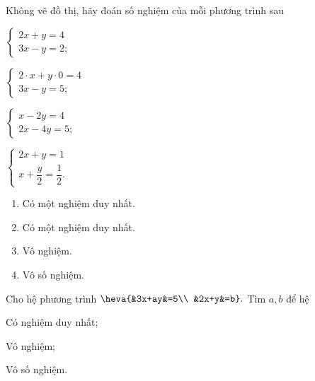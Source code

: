 \begin{bt}%
	Không vẽ đồ thị, hãy đoán số nghiệm của mỗi phương trình sau
	\begin{enumEX}{4}
	\item $\begin{cases}
	{2x + y = 4}\\
	{3x - y = 2;}
	\end{cases}$
	\item $\begin{cases}
	{2\cdot x + y\cdot 0 = 4}\\
	{3x - y = 5;}
	\end{cases}$
	\item $\begin{cases}
	{x - 2y = 4}\\
	{2x - 4y = 5;}
	\end{cases}$
	\item $\begin{cases}
	{2x + y = 1}\\
	{x + \dfrac{y}{2}=\dfrac{1}{2}.}
	\end{cases}$
	\end{enumEX}
	\loigiai
	{
	\begin{enumerate}
	\item Có một nghiệm duy nhất.
	\item Có một nghiệm duy nhất.
	\item Vô nghiệm.
	\item Vô số nghiệm.
	\end{enumerate}	
	}
\end{bt}
\begin{bt}
	Cho hệ phương trình $\heva{&3x+ay&=5\\
	&2x+y&=b}.$ Tìm $a,b$ để hệ
	\begin{enumEX}{3}
	\item Có nghiệm duy nhất;
	\item Vô nghiệm;
	\item Vô số nghiệm.
	\end{enumEX}
\end{bt}
